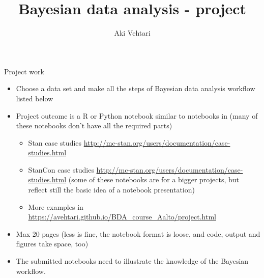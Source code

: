 \documentclass[t]{beamer}
\title[]{Bayesian data analysis - project}
\subtitle{}
\author{Aki Vehtari}
\institute[Aalto]{}
\begin{document}
\begin{frame}

  {\Large\color{navyblue} Project work}
  
  \begin{itemize}
  \item Choose a data set and make all the steps of Bayesian data
    analysis workflow listed below
  \item Project outcome is a R or Python notebook similar to notebooks
    in (many of these notebooks don't have all the required parts)
    \begin{itemize}
    \item Stan case studies \url{http://mc-stan.org/users/documentation/case-studies.html}
    \item StanCon case studies \url{http://mc-stan.org/users/documentation/case-studies.html}
      (some of these notebooks are for a bigger projects, but reflect still the basic idea of a notebook presentation)
    \item More examples in \url{https://avehtari.github.io/BDA_course_Aalto/project.html}
    \end{itemize}
  \item Max 20 pages (less is fine, the notebook format is loose, and code, output and figures take space, too)
  \item The submitted notebooks need to illustrate the knowledge of the
    Bayesian workflow.
  \end{itemize}
\end{frame}
\end{document}
